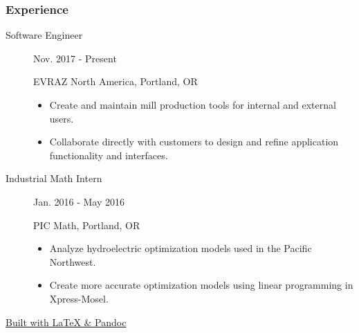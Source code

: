 \documentclass{article}
\begin{document}

\subsubsection*{Experience}

    \begin{description}
		
		\item[Software Engineer] \hfill Nov. 2017 - Present
		
		EVRAZ North America, Portland, OR
		\begin{itemize}
			\item Create and maintain mill production tools for internal and external users.
			\item Collaborate directly with customers to design and refine application functionality and interfaces.
		\end{itemize}
		
		\vspace{0.5em}
		
        \item[Industrial Math Intern] \hfill Jan. 2016 - May 2016
        
        PIC Math, Portland, OR
        \begin{itemize}
            \item Analyze hydroelectric optimization models used in the Pacific Northwest.
            \item Create more accurate optimization models using linear programming in Xpress-Mosel.
        \end{itemize}

        
    \end{description}
    
    \begin{center}
	\vspace{.25in}
    \href{https://www.github.com/BurnsCommaLucas/Resume}{\tiny Built with \LaTeX \hspace{0.001in} \& Pandoc}
    \end{center}
\end{document}
